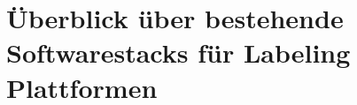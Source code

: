 \section{Überblick über bestehende Softwarestacks für Labeling Plattformen}\label{sec:labeling-platform-ueberblick-softwarestacks}

